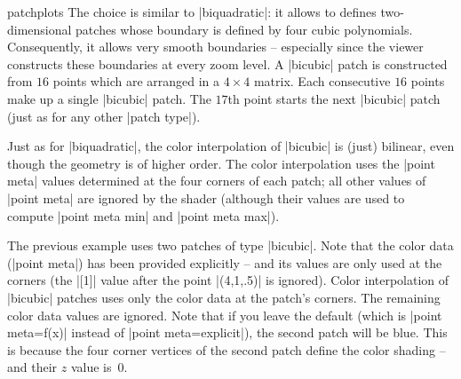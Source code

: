 {\begin{pgfplotslibrary}{patchplots}
The choice  is similar to |biquadratic|: it allows to
defines two-dimensional patches whose boundary is defined by four cubic
polynomials. Consequently, it allows very smooth boundaries -- especially since
the viewer constructs these boundaries at every zoom level. A |bicubic| patch
is constructed from $16$ points which are arranged in a $4\times4$ matrix. Each
consecutive $16$ points make up a single |bicubic| patch. The $17$th point
starts the next |bicubic| patch (just as for any other |patch type|).
%
\begin{codeexample}[]
\end{codeexample}
%
Just as for |biquadratic|, the color interpolation of |bicubic| is (just)
bilinear, even though the geometry is of higher order. The color interpolation
uses the |point meta| values determined at the four corners of each patch; all
other values of |point meta| are ignored by the shader (although their values
are used to compute |point meta min| and |point meta max|).
%
\begin{codeexample}[]
\end{codeexample}
%
The previous example uses two patches of type |bicubic|. Note that the color
data (|point meta|) has been provided explicitly -- and its values are only
used at the corners (the |[1]| value after the point |(4,1,.5)| is ignored).
Color interpolation of |bicubic| patches uses only the color data at the
patch's corners. The remaining color data values are ignored. Note that if you
leave the default (which is |point meta=f(x)| instead of
|point meta=explicit|), the second patch will be blue. This is because the four
corner vertices of the second patch define the color shading -- and their $z$
value is~$0$.


\end{pgfplotslibrary}}
